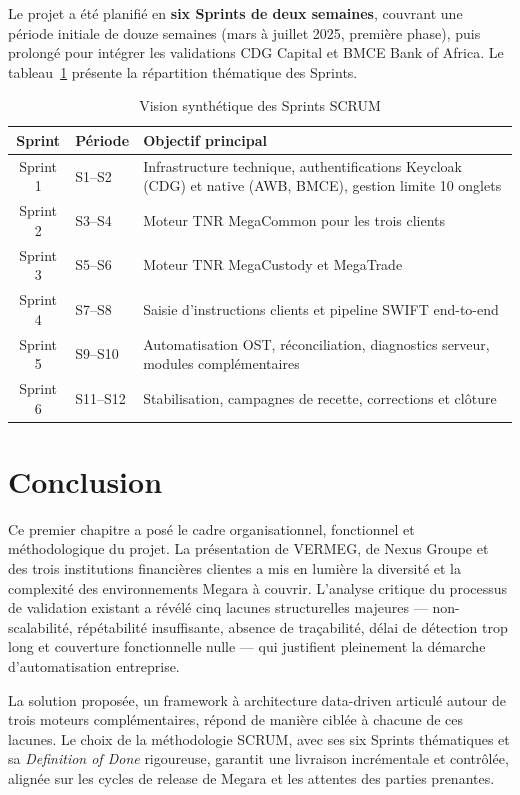 \documentclass[12pt, a4paper]{report}
\begin{document}
Le projet a été planifié en \textbf{six Sprints de deux semaines}, couvrant une période initiale de douze semaines (mars à juillet 2025, première phase), puis prolongé pour intégrer les validations CDG Capital et BMCE Bank of Africa. Le tableau~\ref{tab:sprints_ch1} présente la répartition thématique des Sprints.

\begin{table}[H]
\centering
\caption{Vision synthétique des Sprints SCRUM}
\label{tab:sprints_ch1}
\begin{tabularx}{\textwidth}{clX}
\toprule
\textbf{Sprint} & \textbf{Période} & \textbf{Objectif principal} \\
\midrule
Sprint 1 & S1–S2   & Infrastructure technique, authentifications Keycloak (CDG) et native (AWB, BMCE), gestion limite 10 onglets \\
Sprint 2 & S3–S4   & Moteur TNR MegaCommon pour les trois clients \\
Sprint 3 & S5–S6   & Moteur TNR MegaCustody et MegaTrade \\
Sprint 4 & S7–S8   & Saisie d'instructions clients et pipeline SWIFT end-to-end \\
Sprint 5 & S9–S10  & Automatisation OST, réconciliation, diagnostics serveur, modules complémentaires \\
Sprint 6 & S11–S12 & Stabilisation, campagnes de recette, corrections et clôture \\
\bottomrule
\end{tabularx}
\end{table}

\section*{Conclusion}

Ce premier chapitre a posé le cadre organisationnel, fonctionnel et méthodologique du projet. La présentation de VERMEG, de Nexus Groupe et des trois institutions financières clientes a mis en lumière la diversité et la complexité des environnements Megara à couvrir. L'analyse critique du processus de validation existant a révélé cinq lacunes structurelles majeures — non-scalabilité, répétabilité insuffisante, absence de traçabilité, délai de détection trop long et couverture fonctionnelle nulle — qui justifient pleinement la démarche d'automatisation entreprise.

La solution proposée, un framework à architecture data-driven articulé autour de trois moteurs complémentaires, répond de manière ciblée à chacune de ces lacunes. Le choix de la méthodologie SCRUM, avec ses six Sprints thématiques et sa \textit{Definition of Done} rigoureuse, garantit une livraison incrémentale et contrôlée, alignée sur les cycles de release de Megara et les attentes des parties prenantes.
\end{document}
